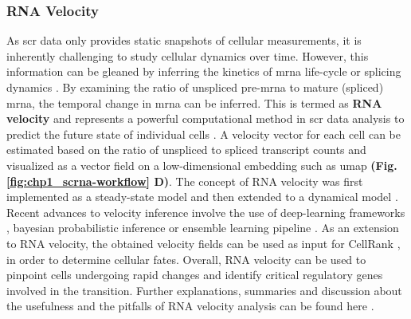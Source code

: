 \subsubsection{RNA Velocity}
\label{subsubsec:chp1_int_rnavelocity}
As \gls{scr} data only provides static snapshots of cellular measurements, it is inherently challenging to study cellular dynamics over time. However, this information can be gleaned by inferring the kinetics of \gls{mrna} life-cycle or splicing dynamics%
. By examining the ratio of unspliced pre-\gls{mrna} to mature (spliced) \gls{mrna}, the temporal change in \gls{mrna} can be inferred. This is termed as \textbf{RNA velocity} and represents a powerful computational method in \gls{scr} data analysis to predict the future state of individual cells \textbf{\cite{weiler_guide_2022}}. A velocity vector for each cell can be estimated based on the ratio of unspliced to spliced transcript counts and visualized as a vector field on a low-dimensional embedding such as \gls{umap} \textbf{(Fig. \ref{fig:chp1_scrna-workflow} D)}. The concept of RNA velocity was first implemented as a steady-state model \textbf{\cite{la_manno_rna_2018}} and then extended to a dynamical model \textbf{\cite{bergen_generalizing_2020}}. Recent advances to velocity inference involve the use of deep-learning frameworks \textbf{\cite{li_relay_2024}}, bayesian probabilistic inference \textbf{\cite{qin_pyro-velocity_2022}} or ensemble learning pipeline \textbf{\cite{wang_velo-predictor_2021}}. 
As an extension to RNA velocity, the obtained velocity fields can be used as input for CellRank \textbf{\cite{lange_cellrank_2022}}, in order to determine cellular fates. Overall, RNA velocity can be used to pinpoint cells undergoing rapid changes and identify critical regulatory genes involved in the transition. Further explanations, summaries and discussion about the usefulness and the pitfalls of RNA velocity analysis can be found here \textbf{\cite{bergen_rna_2021,zheng_pumping_2022}}.

